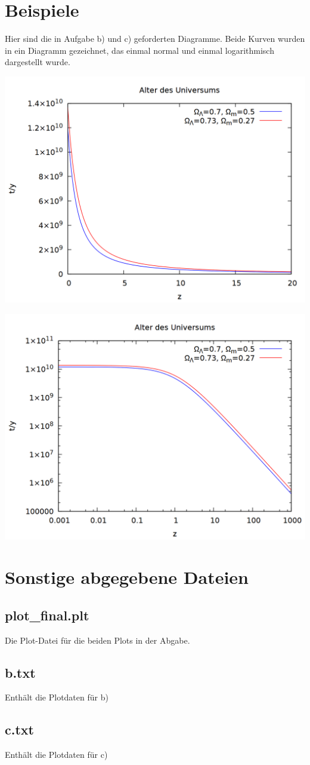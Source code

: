 \documentclass{scrartcl}
\begin{document}
\section*{Beispiele}
Hier sind die in Aufgabe b) und c) geforderten Diagramme. Beide Kurven wurden in ein Diagramm gezeichnet, das einmal normal und einmal logarithmisch dargestellt wurde.
\begin{center}
\includegraphics[scale=0.3]{plot_final} 
\end{center}
\begin{center}
\includegraphics[scale=0.3]{plot_log_final} 
\end{center}

\section*{Sonstige abgegebene Dateien}
\subsection*{plot\_final.plt}
Die Plot-Datei für die beiden Plots in der Abgabe.
\subsection*{b.txt}
Enthält die Plotdaten für b)
\subsection*{c.txt}
Enthält die Plotdaten für c)
\end{document}
